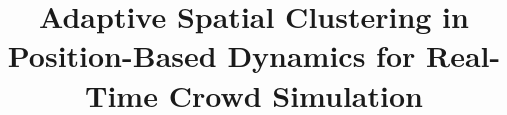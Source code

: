 \documentclass{CSIM}
\begin{document}

\title{Adaptive Spatial Clustering in Position-Based Dynamics for Real-Time Crowd Simulation}



\newpage{}



\newpage{}


\newpage{}
\renewcommand\refname{References Cited}




% 



% 

% 

% 

% 

\end{document}
